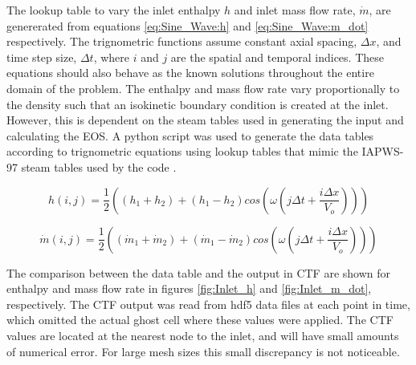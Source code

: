 \documentclass{mc2015}
\begin{document}
The lookup table to vary the inlet enthalpy $h$ and inlet mass
flow rate, $\dot{m}$, are genererated from equations \ref{eq:Sine_Wave:h} and
\ref{eq:Sine_Wave:m_dot} respectively. The trignometric functions assume
constant axial spacing, $\Delta x$, and time step size, $\Delta t$, where $i$
and $j$ are the spatial and temporal indices. These equations should also
behave as the known solutions throughout the entire domain of the problem. The
enthalpy and mass flow rate vary proportionally to the density such that an
isokinetic boundary condition is created at the inlet. However, this is
dependent on the steam tables used in generating the input and calculating the
EOS. A python script was used to generate the data tables according to
trignometric equations using lookup tables that mimic the IAPWS-97 steam tables
used by the code \cite{Cooper2007}.

%
%
%

\begin{equation}
	\label{eq:Sine_Wave:h}
	h(i,j) = \frac{1}{2} \left( 
			(h_{1}+h_{2}) + (h_{1}-h_{2}) cos\left(
				\omega \left( j \Delta t + \frac{i \Delta x}{V_{o}} \right)
				\right)
			\right)
\end{equation}

\begin{equation}
	\label{eq:Sine_Wave:m_dot}
	\dot{m}(i,j) = \frac{1}{2} \left( 
			(\dot{m}_{1}+\dot{m}_{2}) + (\dot{m}_{1}-\dot{m}_{2}) cos\left(
				\omega \left( j \Delta t + \frac{i \Delta x}{V_{o}} \right)
				\right)
			\right)
\end{equation}


The comparison between the data table and the output in CTF are shown for
enthalpy and mass flow rate in figures \ref{fig:Inlet_h} and
\ref{fig:Inlet_m_dot}, respectively. The CTF output was read from hdf5 data
files at each point in time, which omitted the actual ghost cell where these values
were applied. The CTF values are located at the nearest node to the inlet, and
will have small amounts of numerical error. For large mesh sizes this small
discrepancy is not noticeable.
\end{document}
